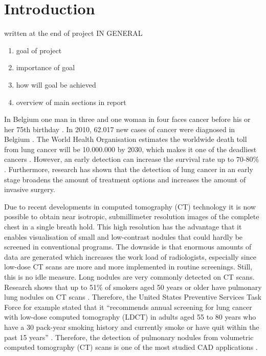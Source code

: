 \section{Introduction}

written at the end of project
IN GENERAL
\begin{enumerate}
\item goal of project
\item importance of goal
\item how will goal be achieved
\item overview of main sections in report
\end{enumerate}

In Belgium one man in three and one woman in four faces cancer before his or
her 75th birthday \cite{kanker}. In 2010, 62.017 new cases of cancer were
diagnosed in Belgium \cite{kankerliga}. The World Health Organisation estimates
the worldwide death toll from lung cancer will be 10.000.000 by 2030, which
makes it one of the deadliest cancers \cite{gu, zheng}.
However, an early detection can increase the survival rate up to 70-80\%
\cite{swensen}. Furthermore, research has shown that the detection of lung
cancer in an early stage broadens the amount of treatment options and increases
the amount of invasive surgery\cite{greenlee}.

Due to recent developments in computed tomography (CT) technology it is now
possible to obtain near isotropic, submillimeter resolution images of the
complete chest in a single breath hold. This high resolution has the advantage
that it enables visualisation of small and low-contrast nodules that could
hardly be screened in conventional programs. The downside is that enormous
amounts of data are generated which increases the work load of radiologists,
especially since low-dose CT scans are more and more implemented in routine
screenings. Still, this is no idle measure. Long nodules are very commonly
detected on CT scans. Research shows that up to 51\% of smokers aged 50 years or
older have pulmonary lung nodules on CT scans \cite{mahon}. Therefore, the
United States Preventive Services Task Force for example stated that it
``recommends annual screening for lung cancer with low-dose computed tomography
(LDCT) in adults aged 55 to 80 years who have a 30 pack-year smoking history and
currently smoke or have quit within the past 15 years'' \cite{ups}. Therefore,
the detection of pulmonary nodules from volumetric computed tomography (CT)
scans is one of the most studied CAD applications \cite{sluimer}.

